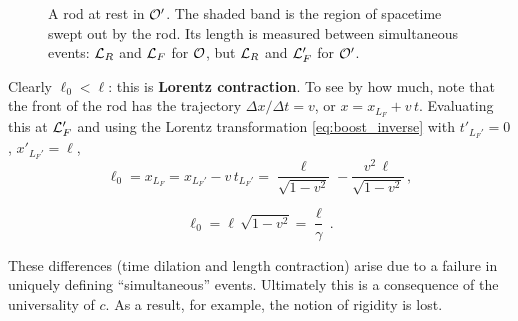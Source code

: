 \begin{figure}[H]
    \centering
    \caption{A rod at rest in $\mathcal{O}'$. The shaded band is the region of spacetime swept out by
        the rod. Its length is measured between simultaneous events: $\mathcal{L}_R$ and $\mathcal{L}_F$
        for $\mathcal{O}$, but $\mathcal{L}_R$ and $\mathcal{L}_F'$ for $\mathcal{O}'$.}
    \label{fig:length_contraction}
\end{figure}

Clearly $\ell_0 < \ell$: this is \textbf{Lorentz contraction}. To see by how much, note that the
front of the rod has the trajectory $\Delta x / \Delta t = v$, or $x = x_{L_F} + v\,t$. Evaluating
this at $\mathcal{L}_F'$ and using the Lorentz transformation \eqref{eq:boost_inverse} with
$t'_{L_F'} = 0$, $x'_{L_F'} = \ell$,
\begin{equation}
    \ell_0 = x_{L_F} = x_{L_F'} - v\, t_{L_F'}
    = \frac{\ell}{\sqrt{1 - v^2}} - \frac{v^2\, \ell}{\sqrt{1 - v^2}} \, ,
\end{equation}
\begin{keyresult}
    \begin{equation}
        \ell_0 = \ell\, \sqrt{1 - v^2} = \frac{\ell}{\gamma} \, .
        \label{eq:length_contraction}
    \end{equation}
\end{keyresult}

These differences (time dilation and length contraction) arise due to a failure in uniquely
defining ``simultaneous'' events. Ultimately this is a consequence of the universality of $c$.
As a result, for example, the notion of rigidity is lost.


